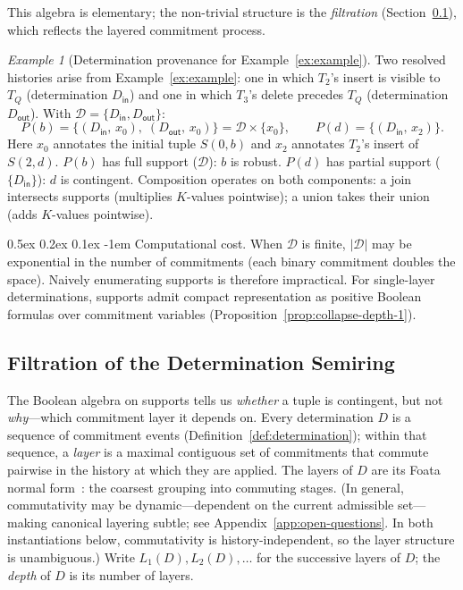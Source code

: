 \documentclass[acmsmall,review,anonymous]{acmart}
\makeatletter
\renewcommand{\paragraph}{\@startsection{paragraph}{4}{\z@}%
  {0.5ex \@plus 0.2ex \@minus 0.1ex}%
  {-1em}%
  {\normalfont\normalsize\bfseries}}
\theoremstyle{remark}
\newtheorem{example}{Example}
\numberwithin{definition}{section}
\numberwithin{theorem}{section}
\numberwithin{lemma}{section}
\numberwithin{corollary}{section}
\numberwithin{remark}{section}
\numberwithin{example}{section}
\numberwithin{observation}{section}
\numberwithin{assumption}{section}
\makeatother
\begin{document}
\noindent
This algebra is elementary; the non-trivial structure is the
\emph{filtration} (Section~\ref{sec:filtration}), which reflects the
layered commitment process.


\begin{example}[Determination provenance for Example~\ref{ex:example}]
  \label{ex:det-semiring}
  Two resolved histories arise from Example~\ref{ex:example}: one in
  which $T_2$'s insert is visible to $T_Q$ (determination
  $D_{\mathsf{in}}$) and one in which $T_3$'s delete precedes $T_Q$
  (determination $D_{\mathsf{out}}$).
  With $\mathcal{D} = \{D_{\mathsf{in}}, D_{\mathsf{out}}\}$:
  \[
    P(b) = \{(D_{\mathsf{in}},\, x_0),\; (D_{\mathsf{out}},\, x_0)\}
         = \mathcal{D} \times \{x_0\},
    \qquad
    P(d) = \{(D_{\mathsf{in}},\, x_2)\}.
  \]
  Here $x_0$ annotates the initial tuple $S(0,b)$ and $x_2$ annotates
  $T_2$'s insert of $S(2,d)$.
  $P(b)$ has full support ($\mathcal{D}$): $b$ is robust.
  $P(d)$ has partial support ($\{D_{\mathsf{in}}\}$): $d$ is contingent.
  Composition operates on both components: a join intersects supports
  (multiplies $K$-values pointwise); a union takes their union (adds
  $K$-values pointwise).
\end{example}

\paragraph{Computational cost.}
When $\mathcal{D}$ is finite, $|\mathcal{D}|$ may be exponential in the
number of commitments (each binary commitment doubles the space).
Naively enumerating supports is therefore impractical.
For single-layer determinations, supports admit compact representation
as positive Boolean formulas over commitment variables
(Proposition~\ref{prop:collapse-depth-1}).

\subsection{Filtration of the Determination Semiring}
\label{sec:filtration}

The Boolean algebra on supports tells us \emph{whether} a tuple is
contingent, but not \emph{why}---which commitment layer it depends on.
Every determination $D$ is a sequence of commitment events
(Definition~\ref{def:determination}); within that sequence, a
\emph{layer} is a maximal contiguous set of commitments that commute
pairwise in the history at which they are applied.
The layers of $D$ are its Foata normal
form~\cite{mazurkiewicz1977concurrent}: the coarsest grouping into
commuting stages.
(In general, commutativity may be dynamic---dependent on the current
admissible set---making canonical layering subtle; see
Appendix~\ref{app:open-questions}.
In both instantiations below, commutativity is history-independent,
so the layer structure is unambiguous.)
Write $L_1(D), L_2(D), \ldots$ for the successive layers of $D$;
the \emph{depth} of $D$ is its number of layers.
\end{document}
